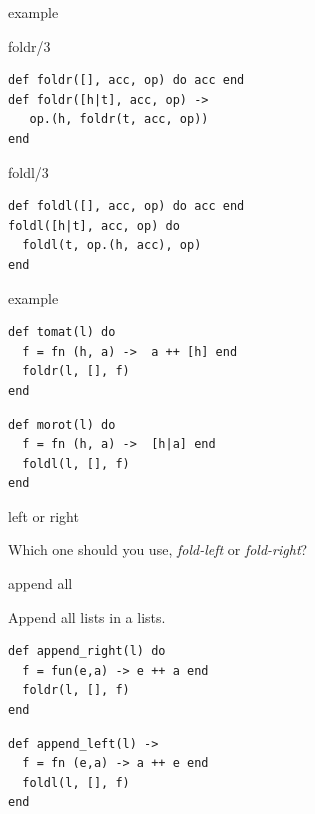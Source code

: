 \begin{frame}[fragile]{example}
     \begin{block}{foldr/3}
       \begin{verbatim}
def foldr([], acc, op) do acc end
def foldr([h|t], acc, op) ->
   op.(h, foldr(t, acc, op))
end
       \end{verbatim}
     \end{block}
\pause
     \begin{block}{foldl/3}
       \begin{verbatim}
def foldl([], acc, op) do acc end
foldl([h|t], acc, op) do
  foldl(t, op.(h, acc), op)
end
       \end{verbatim}
     \end{block}
\end{frame}


\begin{frame}[fragile]{example}

\pause\vspace{10pt}
\begin{verbatim}
def tomat(l) do
  f = fn (h, a) ->  a ++ [h] end
  foldr(l, [], f)
end
\end{verbatim}
\pause 
\begin{verbatim}
def morot(l) do
  f = fn (h, a) ->  [h|a] end
  foldl(l, [], f)
end
\end{verbatim}
\end{frame}

\begin{frame}{left or right}

Which one should you use, {\em fold-left} or {\em fold-right}?

\end{frame}

\begin{frame}[fragile]{append all}

\pause Append all lists in a lists.

\vspace{20pt}

\begin{verbatim}
def append_right(l) do
  f = fun(e,a) -> e ++ a end
  foldr(l, [], f)
end
\end{verbatim}

\begin{verbatim}
def append_left(l) ->
  f = fn (e,a) -> a ++ e end
  foldl(l, [], f)
end
\end{verbatim}

\end{frame}



